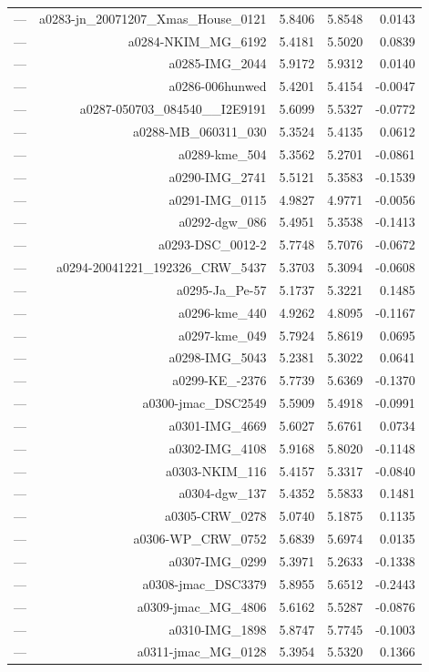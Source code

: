 \begin{table}[htbp]
\begin{tabular}{lrrrr}
— & a0283-jn_20071207_Xmas_House_0121 & 5.8406 & 5.8548 & 0.0143 \\
— & a0284-NKIM_MG_6192 & 5.4181 & 5.5020 & 0.0839 \\
— & a0285-IMG_2044 & 5.9172 & 5.9312 & 0.0140 \\
— & a0286-006hunwed & 5.4201 & 5.4154 & -0.0047 \\
— & a0287-050703_084540__I2E9191 & 5.6099 & 5.5327 & -0.0772 \\
— & a0288-MB_060311_030 & 5.3524 & 5.4135 & 0.0612 \\
— & a0289-kme_504 & 5.3562 & 5.2701 & -0.0861 \\
— & a0290-IMG_2741 & 5.5121 & 5.3583 & -0.1539 \\
— & a0291-IMG_0115 & 4.9827 & 4.9771 & -0.0056 \\
— & a0292-dgw_086 & 5.4951 & 5.3538 & -0.1413 \\
— & a0293-DSC_0012-2 & 5.7748 & 5.7076 & -0.0672 \\
— & a0294-20041221_192326_CRW_5437 & 5.3703 & 5.3094 & -0.0608 \\
— & a0295-Ja_Pe-57 & 5.1737 & 5.3221 & 0.1485 \\
— & a0296-kme_440 & 4.9262 & 4.8095 & -0.1167 \\
— & a0297-kme_049 & 5.7924 & 5.8619 & 0.0695 \\
— & a0298-IMG_5043 & 5.2381 & 5.3022 & 0.0641 \\
— & a0299-KE_-2376 & 5.7739 & 5.6369 & -0.1370 \\
— & a0300-jmac_DSC2549 & 5.5909 & 5.4918 & -0.0991 \\
— & a0301-IMG_4669 & 5.6027 & 5.6761 & 0.0734 \\
— & a0302-IMG_4108 & 5.9168 & 5.8020 & -0.1148 \\
— & a0303-NKIM_116 & 5.4157 & 5.3317 & -0.0840 \\
— & a0304-dgw_137 & 5.4352 & 5.5833 & 0.1481 \\
— & a0305-CRW_0278 & 5.0740 & 5.1875 & 0.1135 \\
— & a0306-WP_CRW_0752 & 5.6839 & 5.6974 & 0.0135 \\
— & a0307-IMG_0299 & 5.3971 & 5.2633 & -0.1338 \\
— & a0308-jmac_DSC3379 & 5.8955 & 5.6512 & -0.2443 \\
— & a0309-jmac_MG_4806 & 5.6162 & 5.5287 & -0.0876 \\
— & a0310-IMG_1898 & 5.8747 & 5.7745 & -0.1003 \\
— & a0311-jmac_MG_0128 & 5.3954 & 5.5320 & 0.1366 \\

\end{tabular}
\end{table}
